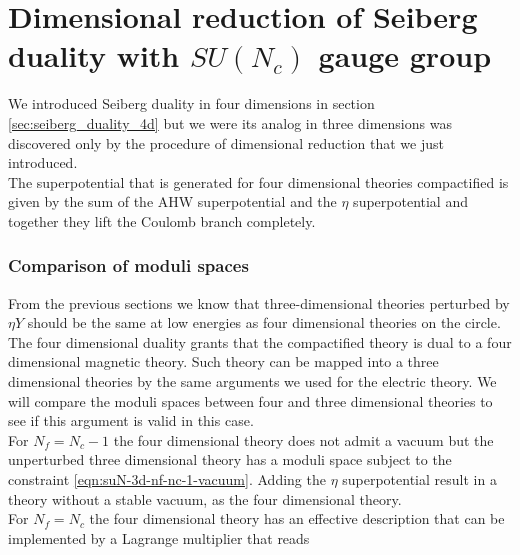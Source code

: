 \section{Dimensional reduction of Seiberg duality with $SU(N_c)$ gauge group}
We introduced Seiberg duality in four dimensions in section \ref{sec:seiberg_duality_4d} but we were its analog in three dimensions was discovered only by the procedure of dimensional reduction that we just introduced.\\
The superpotential that is generated for four dimensional theories compactified is given by the sum of the AHW superpotential and the $\eta$ superpotential and together they lift the Coulomb branch completely.\\

\subsubsection{Comparison of moduli spaces}
\begin{comment}
For $N_f = N_c$ it can be described by the effective superpotential
\begin{equation}
 W=  \lambda \left( B \tilde{B} - \Det{(M)} +    \right)
\end{equation}
which modifies the Higgs branch and lifts the Coulomb branch.
For greater number of flavours the Higgs branch remains identical while the Coulomb branch remains lifted.\\
\end{comment}
From the previous sections we know that three-dimensional theories perturbed by $\eta Y$ should be the same at low energies as four dimensional theories on the circle. 
The four dimensional duality grants that the compactified theory is dual to a four dimensional magnetic theory. 
Such theory can be mapped into a three dimensional theories by the same arguments we used for the electric theory.  
We will compare the moduli spaces between four and three dimensional theories to see if this argument is valid in this case.\\
For $N_f = N_c -1$ the four dimensional theory does not admit a vacuum but the unperturbed three dimensional theory has a moduli space subject to the constraint \eqref{eqn:suN-3d-nf-nc-1-vacuum}.
Adding the $\eta$ superpotential result in a theory without a stable vacuum, as the four dimensional theory.\\
For $N_f = N_c$ the four dimensional theory has an effective description that can be implemented by a Lagrange multiplier that reads
